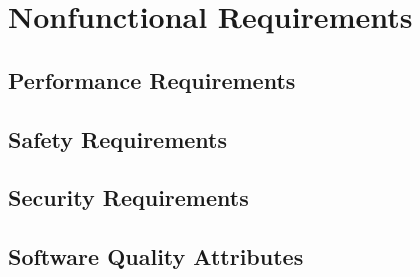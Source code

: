 \chapter{Nonfunctional Requirements}
\section{Performance Requirements}

\section{Safety Requirements}

\section{Security Requirements}

\section{Software Quality Attributes}

